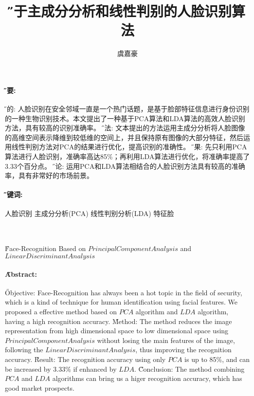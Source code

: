 \documentclass[9pt]{article}
\title{\huge \H 基于主成分分析和线性判别的人脸识别算法}
\author{\large 虞嘉豪}
\date{}
\begin{document}
\maketitle
\paragraph{\H 摘要: }
	{\H 目的: } 人脸识别在安全邻域一直是一个热门话题，是基于脸部特征信息进行身份识别的一种生物识别技术。本文提出了一种基于PCA算法和LDA算法的高效人脸识别方法，具有较高的识别准确率。
	{\H 方法: } 文本提出的方法运用主成分分析将人脸图像的高维空间表示降维到较低维的空间上，并且保持原有图像的大部分特征，然后运用线性判别方法对PCA的结果进行优化，提高识别的准确性。
	{\H 结果: } 先只利用PCA算法进行人脸识别，准确率高达85\%；再利用LDA算法进行优化，将准确率提高了3.33个百分点。
	{\H 结论: } 运用PCA和LDA算法相结合的人脸识别方法具有较高的准确率，具有非常好的市场前景。
\paragraph{\H 关键词: } 人脸识别 主成分分析(PCA) 线性判别分析(LDA) 特征脸 \\ \\ \\

\begin{center}
	{\Large \H Face-Recognition Based on $Principal Component Analysis$ and $Linear Discriminant Analysis$} \\
	\linespread{2}\selectfont {\large Chaos John}
\end{center}
\paragraph{\H Abstract: } 
	{\H Objective: } Face-Recognition has always been a hot topic in the field of security, which is a kind of technique for human identification using facial features. We proposed a effective method based on $PCA$ algorithm and $LDA$ algorithm, having a high recognition accuracy.
	{\H Method: } The method reduces the image representation from high dimensional space to low dimensional space using $Principal Component Analysis$ without losing the main features of the image, following the $Linear Discriminant Analysis$, thus improving the recognition accuracy.
	{\H Result: } The recognition accuracy using only $PCA$ is up to 85\%, and can be increased by  3.33\% if enhanced by $LDA$. 
	{\H Conclusion: } The method combining $PCA$ and $LDA$ algorithms can bring us a higer recognition accuracy, which has good market prospects. 
\end{document}
